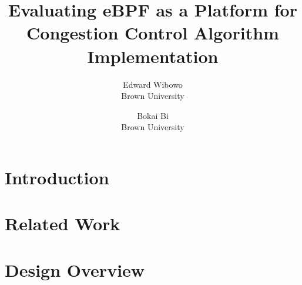 

\date{}

\title{\Large \bf Evaluating eBPF as a Platform for Congestion Control Algorithm Implementation}

\author{
{\rm Edward Wibowo}\\
Brown University
\and
{\rm Bokai Bi}\\
Brown University
} %

\maketitle

\begin{abstract}

\end{abstract}


\section{Introduction}


\section{Related Work}


\section{Design Overview}


